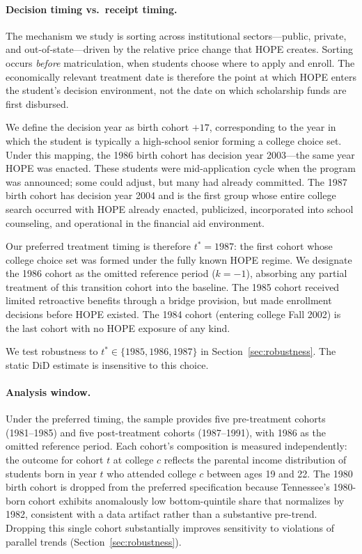 \paragraph{Decision timing vs.\ receipt timing.}

The mechanism we study is sorting across institutional
sectors---public, private, and out-of-state---driven by the relative
price change that HOPE creates. Sorting occurs \emph{before}
matriculation, when students choose where to apply and enroll. The
economically relevant treatment date is therefore the point at which
HOPE enters the student's decision environment, not the date on which
scholarship funds are first disbursed.

We define the decision year as birth cohort $+ 17$, corresponding to
the year in which the student is typically a high-school senior forming
a college choice set. Under this mapping, the 1986 birth cohort has
decision year 2003---the same year HOPE was enacted. These students were
mid-application cycle when the program was announced; some could adjust,
but many had already committed. The 1987 birth cohort has decision year
2004 and is the first group whose entire college search occurred with
HOPE already enacted, publicized, incorporated into school counseling,
and operational in the financial aid environment.

Our preferred treatment timing is therefore $t^* = 1987$: the first
cohort whose college choice set was formed under the fully known HOPE
regime. We designate the 1986 cohort as the omitted reference period
($k = -1$), absorbing any partial treatment of this transition cohort
into the baseline. The 1985 cohort received limited retroactive benefits
through a bridge provision, but made enrollment decisions before HOPE
existed. The 1984 cohort (entering college Fall 2002) is the last
cohort with no HOPE exposure of any kind.

We test robustness to $t^* \in \{1985, 1986, 1987\}$ in
Section~\ref{sec:robustness}. The static DiD estimate is insensitive to
this choice.

\paragraph{Analysis window.}

Under the preferred timing, the sample provides five pre-treatment
cohorts (1981--1985) and five post-treatment cohorts (1987--1991), with
1986 as the omitted reference period. Each cohort's composition is
measured independently: the outcome for cohort $t$ at college $c$
reflects the parental income distribution of students born in year $t$
who attended college $c$ between ages 19 and 22. The 1980 birth cohort
is dropped from the preferred specification because Tennessee's
1980-born cohort exhibits anomalously low bottom-quintile share that
normalizes by 1982, consistent with a data artifact rather than a
substantive pre-trend. Dropping this single cohort substantially
improves sensitivity to violations of parallel trends
(Section~\ref{sec:robustness}).

